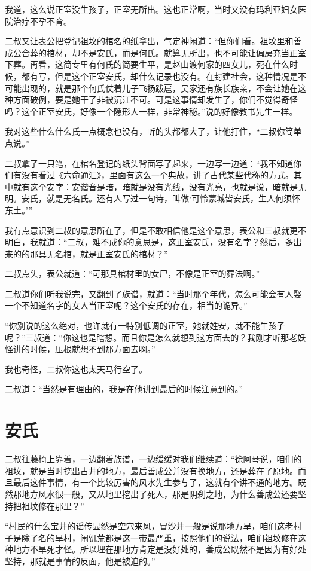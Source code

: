 我道，这么说正室没生孩子，正室无所出。这也正常啊，当时又没有玛利亚妇女医院治疗不孕不育。

二叔又让表公把登记祖坟的棺名的纸拿出，气定神闲道：“但你们看。祖坟里和善成公合葬的棺材，却不是安氏，而是何氏。就算无所出，也不可能让偏房充当正室下葬。再看，这简专里有何氏的简要生平，是赵山渡何家的四女儿，死在什么时候，都有写，但是这个正室安氏，却什么记录也没有。在封建社会，这种情况是不可能出现的，就是那个何氏仗着儿子飞扬跋扈，吴家还有族长族亲，不会让她在这种方面破例，要是她干了非被沉江不可。可是这事情却发生了，你们不觉得奇怪吗？这个正室安氏，好像一个隐形人一样，非常神秘。”说的好像教书先生一样。

我对这些什么什么氏一点概念也没有，听的头都都大了，让他打住，“二叔你简单点说。”

二叔拿了一只笔，在棺名登记的纸头背面写了起来，一边写一边道：“我不知道你们有没有看过《六命通汇》，里面有这么一个典故，讲了古代某些代称的方式。其中就有这个安字：安谐音是暗，暗就是没有光线，没有光亮，也就是说，暗就是无明。安氏，就是无名氏。还有人写过一句诗，叫做‘可怜蒙城皆安氏，生人何须怀东土。’”

我有点意识到二叔的意思所在了，但是不敢相信他是这个意思，表公和三叔就更不明白，我就道：“二叔，难不成你的意思是，这正室安氏，没有名字？然后，多出来的的那具无名棺，就是正室安氏的棺材？”

二叔点头，表公就道：“可那具棺材里的女尸，不像是正室的葬法啊。”

二叔道你们听我说完，又翻到了族谱，就道：“当时那个年代，怎么可能会有人娶一个不知道名字的女人当正室呢？这个安氏的存在，相当的诡异。”

“你别说的这么绝对，也许就有一特别低调的正室，她就姓安，就不能生孩子呢？”三叔道：“你这也是瞎想。而且你是怎么就想到这方面去的？我刚才听那老妖怪讲的时候，压根就想不到那方面去啊。”

我也奇怪，二叔你这也太天马行空了。

二叔道：“当然是有理由的，我是在他讲到最后的时候注意到的。”

\chapter{安氏}

二叔往藤椅上靠着，一边翻着族谱，一边缓缓对我们继续道：“徐阿琴说，咱们的祖坟，就是当时挖出古井的地方，最后善成公并没有换地方，还是葬在了原地。而且最后这件事情，有一个比较厉害的风水先生参与了，这就有个讲不通的地方。既然那地方风水很一般，又从地里挖出了死人，那是阴刹之地，为什么善成公还要坚持把祖坟修在那里？”

“村民的什么宝井的谣传显然是空穴来风，冒沙井一般是说那地方旱，咱们这老村子是除了名的旱村，闹饥荒都是这一带最严重，按照他们的说法，咱们祖坟修在这种地方不旱死才怪。所以埋在那地方肯定是没好处的，善成公既然不是因为有好处坚持，那就是事情的反面，他是被迫的。”

